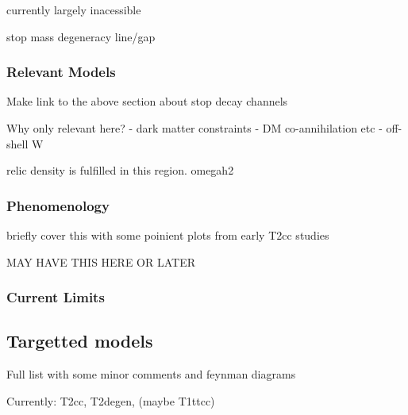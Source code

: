 currently largely inacessible

stop mass degeneracy line/gap

\subsubsection{Relevant Models}
Make link to the above section about stop decay channels

Why only relevant here?
- dark matter constraints - DM co-annihilation etc
- off-shell W

relic density is fulfilled in this region. omegah2

\subsubsection{Phenomenology}
briefly cover this with some poinient plots from early T2cc studies

MAY HAVE THIS HERE OR LATER
\subsubsection{Current Limits}

\subsection{Targetted models}
Full list with some minor comments and feynman diagrams

Currently: T2cc, T2degen, (maybe T1ttcc)